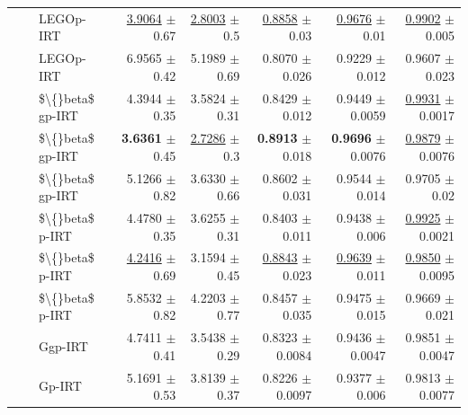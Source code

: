 \begin{longtable}{llp{}rrrrr}
 &  & LEGOp-IRT & \underline{3.9064} {\scriptsize $\pm$ 0.67} & \underline{2.8003} {\scriptsize $\pm$ 0.5} & \underline{0.8858} {\scriptsize $\pm$ 0.03} & \underline{0.9676} {\scriptsize $\pm$ 0.01} & \underline{0.9902} {\scriptsize $\pm$ 0.005} \\
 &  & LEGOp-IRT & 6.9565 {\scriptsize $\pm$ 0.42} & 5.1989 {\scriptsize $\pm$ 0.69} & 0.8070 {\scriptsize $\pm$ 0.026} & 0.9229 {\scriptsize $\pm$ 0.012} & 0.9607 {\scriptsize $\pm$ 0.023} \\
 &  & \$\textbackslash\{\}beta\$ gp-IRT & 4.3944 {\scriptsize $\pm$ 0.35} & 3.5824 {\scriptsize $\pm$ 0.31} & 0.8429 {\scriptsize $\pm$ 0.012} & 0.9449 {\scriptsize $\pm$ 0.0059} & \underline{0.9931} {\scriptsize $\pm$ 0.0017} \\
 &  & \$\textbackslash\{\}beta\$ gp-IRT & \textbf{3.6361} {\scriptsize $\pm$ 0.45} & \underline{2.7286} {\scriptsize $\pm$ 0.3} & \textbf{0.8913} {\scriptsize $\pm$ 0.018} & \textbf{0.9696} {\scriptsize $\pm$ 0.0076} & \underline{0.9879} {\scriptsize $\pm$ 0.0076} \\
 &  & \$\textbackslash\{\}beta\$ gp-IRT & 5.1266 {\scriptsize $\pm$ 0.82} & 3.6330 {\scriptsize $\pm$ 0.66} & 0.8602 {\scriptsize $\pm$ 0.031} & 0.9544 {\scriptsize $\pm$ 0.014} & 0.9705 {\scriptsize $\pm$ 0.02} \\
 &  & \$\textbackslash\{\}beta\$ p-IRT & 4.4780 {\scriptsize $\pm$ 0.35} & 3.6255 {\scriptsize $\pm$ 0.31} & 0.8403 {\scriptsize $\pm$ 0.011} & 0.9438 {\scriptsize $\pm$ 0.006} & \underline{0.9925} {\scriptsize $\pm$ 0.0021} \\
 &  & \$\textbackslash\{\}beta\$ p-IRT & \underline{4.2416} {\scriptsize $\pm$ 0.69} & 3.1594 {\scriptsize $\pm$ 0.45} & \underline{0.8843} {\scriptsize $\pm$ 0.023} & \underline{0.9639} {\scriptsize $\pm$ 0.011} & \underline{0.9850} {\scriptsize $\pm$ 0.0095} \\
 &  & \$\textbackslash\{\}beta\$ p-IRT & 5.8532 {\scriptsize $\pm$ 0.82} & 4.2203 {\scriptsize $\pm$ 0.77} & 0.8457 {\scriptsize $\pm$ 0.035} & 0.9475 {\scriptsize $\pm$ 0.015} & 0.9669 {\scriptsize $\pm$ 0.021} \\
 &  & Ggp-IRT & 4.7411 {\scriptsize $\pm$ 0.41} & 3.5438 {\scriptsize $\pm$ 0.29} & 0.8323 {\scriptsize $\pm$ 0.0084} & 0.9436 {\scriptsize $\pm$ 0.0047} & 0.9851 {\scriptsize $\pm$ 0.0047} \\
 &  & Gp-IRT & 5.1691 {\scriptsize $\pm$ 0.53} & 3.8139 {\scriptsize $\pm$ 0.37} & 0.8226 {\scriptsize $\pm$ 0.0097} & 0.9377 {\scriptsize $\pm$ 0.006} & 0.9813 {\scriptsize $\pm$ 0.0077} \\

\end{longtable}
